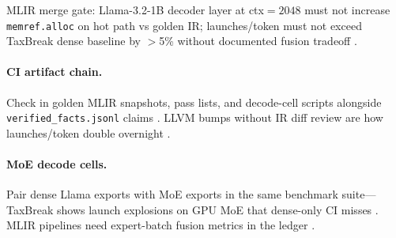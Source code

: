 \begin{example}
MLIR merge gate: Llama-3.2-1B decoder layer at ctx${=}2048$ must not increase \texttt{memref.alloc} on hot path vs golden IR; launches/token must not exceed TaxBreak dense baseline by $>$5\% without documented fusion tradeoff \citep{taxbreak2026,memoryfloor2026,yirage2026,chen2020compilerbasedhardw,patel2025llminference,kwon2023vllm,liu2024deepseekv3,amd2024aie,amd2024xdna,dao2022flashattention,dao2023flashdecoding,nvidia2024cudagraphs,nvidia2022hopper,semianalysis2024tma,dlbook}.
\end{example}

\paragraph{CI artifact chain.} Check in golden MLIR snapshots, pass lists, and decode-cell scripts alongside \texttt{verified\_facts.jsonl} claims \citep{yirage2026,chen2020compilerbasedhardw,patel2025llminference,memoryfloor2026,taxbreak2026,kwon2023vllm,liu2024deepseekv3,amd2024aie,amd2024xdna,dao2022flashattention,dao2023flashdecoding,nvidia2024cudagraphs,nvidia2022hopper,semianalysis2024tma,dlbook}. LLVM bumps without IR diff review are how launches/token double overnight \citep{liu2024deepseekv3,chen2020compilerbasedhardw,yirage2026,memoryfloor2026,taxbreak2026,patel2025llminference,kwon2023vllm,amd2024aie,amd2024xdna,dao2022flashattention,dao2023flashdecoding,nvidia2024cudagraphs,nvidia2022hopper,semianalysis2024tma,dlbook}.

\paragraph{MoE decode cells.} Pair dense Llama exports with MoE exports in the same benchmark suite---TaxBreak shows launch explosions on GPU MoE that dense-only CI misses \citep{taxbreak2026,liu2024deepseekv3,yirage2026,chen2020compilerbasedhardw,patel2025llminference,memoryfloor2026,kwon2023vllm,amd2024aie,amd2024xdna,dao2022flashattention,dao2023flashdecoding,nvidia2024cudagraphs,nvidia2022hopper,semianalysis2024tma,dlbook}. MLIR pipelines need expert-batch fusion metrics in the ledger \citep{yirage2026,taxbreak2026,liu2024deepseekv3,chen2020compilerbasedhardw,patel2025llminference,memoryfloor2026,kwon2023vllm,amd2024aie,amd2024xdna,dao2022flashattention,dao2023flashdecoding,nvidia2024cudagraphs,nvidia2022hopper,semianalysis2024tma,dlbook}.

